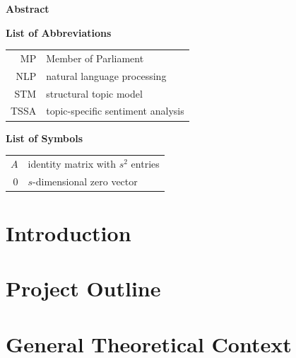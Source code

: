 \documentclass[12pt]{article}
\begin{document}

\newpage

\Large
\noindent
\textbf{Abstract}
\vspace{0.5cm} \\
\noindent
\normalsize

\newpage

\tableofcontents
\newpage

\listoffigures
\newpage
\listoftables
\newpage

\Large
\noindent
\textbf{List of Abbreviations}
\vspace{0.5cm} \\
\noindent
\normalsize

\begin{tabular}{rl}
  MP & Member of Parliament \\
  NLP & natural language processing \\
  STM & structural topic model \\
  TSSA & topic-specific sentiment analysis
\end{tabular}

\vspace{1cm}

\Large
\noindent
\textbf{List of Symbols}
\vspace{0.5cm} \\
\noindent
\normalsize

\begin{tabular}{rl}
  $A$ & identity matrix with $s^2$ entries  \\
  $0$ & $s$-dimensional zero vector
\end{tabular}

\newpage


    
\section{Introduction}
\label{intro}


\section{Project Outline}
\label{project}


\section{General Theoretical Context}
\label{theory}

\end{document}
